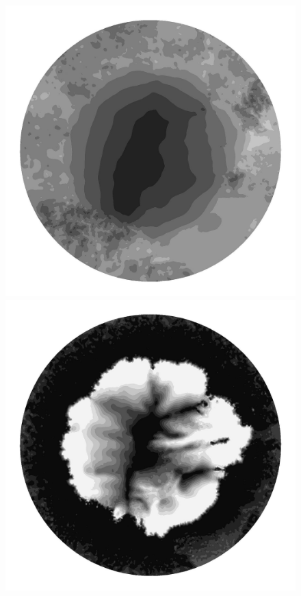 \begin{figure}
  \begin{minipage}[b]{0.30\linewidth}
    \includegraphics[width=1.0\textwidth]{images/EISMINT_II/U/S_5000.jpg}
  \end{minipage}
  \quad
  \begin{minipage}[b]{0.30\linewidth}
    \includegraphics[width=1.0\textwidth]{images/EISMINT_II/U/beta_5000.jpg}

\end{minipage}
\end{figure}

